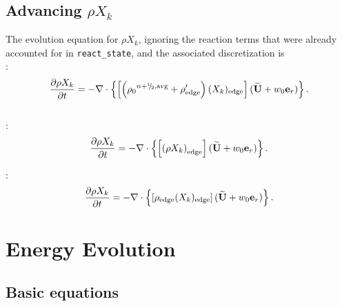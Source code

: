 \subsection{Advancing $\rho X_k$}\label{Advancing rhoX_k}
The evolution equation for $\rho X_k$, ignoring the reaction terms
that were already accounted for in {\tt react\_state}, and the
associated discretization is \\

:
\begin{equation}
\frac{\partial\rho X_k}{\partial t} = 
-\nabla\cdot\left\{\left[\left({\rho_0}^{n+\myhalf,{\rm avg}}
+ \rho'_\mathrm{edge} \right)(X_k)_\mathrm{edge} \right](\Ubt+w_0\eb_r)\right\}.
\end{equation} \\


:
\begin{equation}
\frac{\partial\rho X_k}{\partial t} = 
-\nabla\cdot\left\{\left[\left(\rho X_k \right)_\mathrm{edge} \right](\widetilde{{\bf U}}+w_0{\bf e}_r)\right\}.
\end{equation}


:
\begin{equation}
\frac{\partial\rho X_k}{\partial t} = 
-\nabla\cdot\left\{\left[\rho_\mathrm{edge} (X_k)_\mathrm{edge} \right](\widetilde{{\bf U}}+w_0{\bf e}_r)\right\}.
\end{equation}


\section{Energy Evolution}

\subsection{Basic equations}

